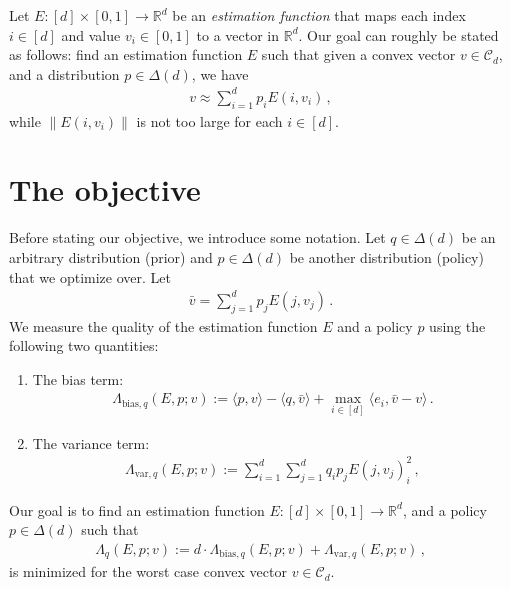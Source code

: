 \documentclass{article}
\theoremstyle{plain}
\theoremstyle{definition}
\theoremstyle{plain}
\newcommand{\R}{\mathbb R}
\newcommand{\Rd}{\mathbb{R}^d}
\newcommand{\cC}{\mathcal C}
\newcommand{\abovelabel}[1]{\stackrel{\raisebox{0.5mm}{\textrm{\tiny \color{red} #1}}}}
\begin{document}
Let $E:[d] \times [0, 1] \to \Rd$ be an \emph{estimation function} that maps each index $i \in [d]$ and value $v_i \in [0, 1]$ to a vector in $\Rd$.
Our goal can roughly be stated as follows:
find an estimation function $E$ such that given a convex vector $v \in \cC_d$, and a distribution $p \in \Delta(d)$, we have
\begin{align}
    v \approx \sum_{i=1}^d p_i E(i, v_i)\,,
\end{align}
while $\|E(i, v_i)\|$ is not too large for each $i \in [d]$.

\section{The objective}
Before stating our objective, we introduce some notation.
Let $q \in \Delta(d)$ be an arbitrary distribution (prior)
and $p \in \Delta(d)$ be another distribution (policy) that we optimize over.
Let
\begin{align}
    \bar{v} = \sum_{j=1}^d p_j E(j, v_j)\,.
\end{align}
We measure the quality of the estimation function $E$ and a policy $p$ using the following two quantities:
\begin{enumerate}
    \item The bias term:
          \begin{align}
              \Lambda_{\text{bias}, q}(E, p ; v) :=
              \langle p, v\rangle - \langle q, \bar{v} \rangle
              +
              \max_{i \in [d]} \langle e_i, \bar{v}- v \rangle\,.
          \end{align}
    \item The variance term:
          \begin{align}
              \Lambda_{\text{var}, q}(E, p ; v) :=
              \sum_{i=1}^d \sum_{j=1}^d q_i p_j E(j, v_j)_i^2\,,
          \end{align}
\end{enumerate}

Our goal is to find an estimation function $E:[d] \times [0, 1] \to \Rd$, and a policy $p \in \Delta(d)$ such that
\begin{align}
    \Lambda_q(E, p ; v) := d \cdot \Lambda_{\text{bias}, q}(E, p ; v) + \Lambda_{\text{var}, q}(E, p ; v)\,,
\end{align}
is minimized for the worst case convex vector $v \in \cC_d$.
\end{document}

